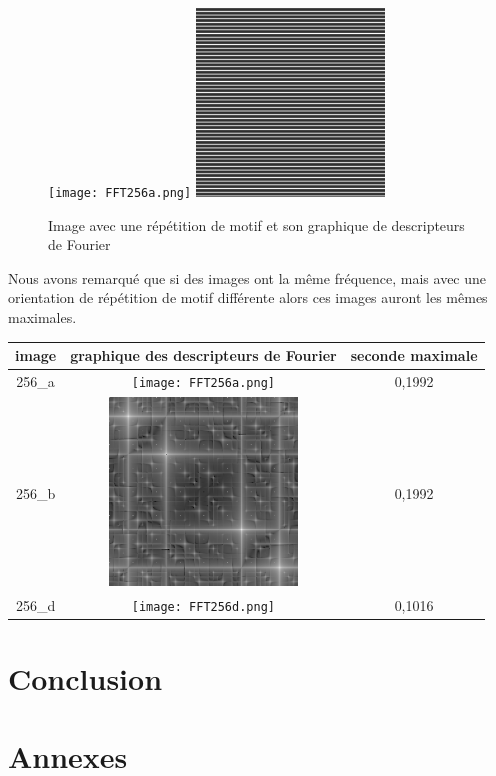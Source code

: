 \documentclass[a4paper,11pt]{article}
\begin{document}
  \begin{figure}[H]
  \center
   \texttt{[image: FFT256a.png]}
   \includegraphics[width=5cm]{256_a.jpg}
   \caption{Image avec une répétition de motif et son graphique de descripteurs de Fourier}
  \end{figure}
  
  Nous avons remarqué que si des images ont la même fréquence, mais avec une orientation de répétition de motif
  différente alors ces images auront les mêmes maximales.
  
  \begin{tabular}{|c|c|c|}
  \hline
   image & graphique des descripteurs de Fourier & seconde maximale \\
  \hline
  256\_a & \texttt{[image: FFT256a.png]} & 0,1992\\
  \hline
  256\_b & \includegraphics[width=5cm]{FFT256b.jpg} & 0,1992\\
  \hline
  256\_d & \texttt{[image: FFT256d.png]} & 0,1016\\
  \hline
  \end{tabular}
  
  \section*{Conclusion}
  
  
  \newpage
  \section*{Annexes}
  
\end{document}
